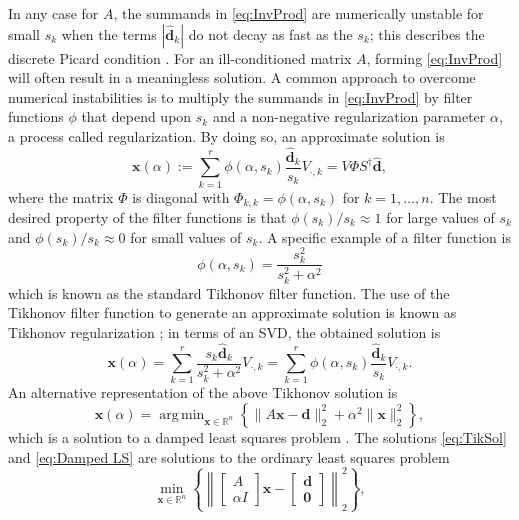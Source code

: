 \documentclass[12pt]{article}
\newcommand{\dVec}{\mathbf{d}}	%
\newcommand{\xVec}{\mathbf{x}}	%
\newcommand{\regparam}{\alpha}  %
\DeclareMathOperator*{\argmin}{arg\,min}
\newcommand{\filt}{\phi}
\newcommand{\zeroVec}{\bm{0}}	%
\newcommand{\singular}{s}	%
\newcommand{\svd}[1]{\widehat{#1}}	%
\begin{document}
In any case for $A$, the summands in \eqref{eq:InvProd} are numerically unstable for small $\singular_k$ when the terms $|\svd{\dVec}_k|$ do not decay as fast as the $s_k$; this describes the discrete Picard condition \cite{Hansen:98}. For an ill-conditioned matrix $A$, forming \eqref{eq:InvProd} will often result in a meaningless solution. A common approach to overcome numerical instabilities is to multiply the summands in \eqref{eq:InvProd} by filter functions $\filt$ that depend upon $\singular_k$ and a non-negative regularization parameter $\regparam$, a process called regularization. By doing so, an approximate solution is
\begin{equation}
\label{eq:ApproxSol}
\xVec(\regparam) := \sum_{k=1}^{r} \filt(\regparam,\singular_k) \frac{\svd{\dVec}_k}{\singular_k}V_{\cdot,k}  = V\Phi{S}^\dagger\svd{\dVec},
\end{equation}
where the matrix $\Phi$ is diagonal with $\Phi_{k,k} = \filt(\regparam,\singular_k)$ for $k = 1,\ldots,{n}$. The most desired property of the filter functions is that $\filt(\singular_k)/\singular_k \approx 1$  for large values of $\singular_k$ and $\filt(\singular_k)/\singular_k \approx 0$ for small values of $\singular_k$. A specific example of a filter function is
\begin{equation}
\label{eq:TikFilt}
\filt(\regparam,\singular_k)  = \frac{\singular_k^2}{\singular_k^2 + \regparam^2}
\end{equation}
which is known as the standard Tikhonov filter function. The use of the Tikhonov filter function to generate an approximate solution is known as Tikhonov regularization \cite{Tikh1963}; in terms of an SVD, the obtained solution is
\begin{equation}
\label{eq:TikSol}
\xVec(\regparam) = \sum_{k = 1}^{r} \frac{\singular_k \svd{\dVec}_k}{\singular_k^2 + \regparam^2}V_{\cdot,k} = \sum_{k = 1}^{r} \filt(\regparam,\singular_k)\frac{\svd{\dVec}_k}{\singular_k}V_{\cdot,k}.
\end{equation}
An alternative representation of the above Tikhonov solution is
\begin{equation}
\label{eq:Damped LS}
\xVec(\regparam) = \argmin_{\xVec \in \mathbb{R}^n} \left\{\|A\xVec - \dVec\|_2^2 + \regparam^2\|\xVec\|_2^2\right\},
\end{equation}
which is a solution to a damped least squares problem \cite{ABT}. The solutions \eqref{eq:TikSol} and \eqref{eq:Damped LS} are solutions to the ordinary least squares problem
\begin{equation}
\label{eq:Ordinary LS}
\min_{\xVec \in \mathbb{R}^n} \left\{\left\|
\begin{bmatrix}
A \\
\regparam I
\end{bmatrix}\xVec - 
\begin{bmatrix}
\dVec \\
\zeroVec
\end{bmatrix}
\right\|_2^2\right\},
\end{equation}
\end{document}
